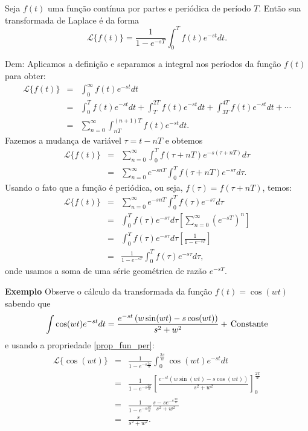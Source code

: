 \documentclass[a4paper,10pt]{book}
\begin{document}
 Seja $f(t)$ uma função contínua por partes e periódica de período $T$. Então sua transformada de Laplace é da forma
\begin{equation}
\mathcal{L}\{f(t)\}=\frac{1}{1-e^{-sT}}\int_0^Tf(t)e^{-st}dt.
\end{equation}


Dem: Aplicamos a definição e separamos a integral nos períodos da função $f(t)$ para obter:
\begin{eqnarray*}
 \mathcal{L}\{f(t)\}&=&\int_0^\infty f(t)e^{-st}dt \\
 &=&\int_0^T f(t)e^{-st}dt+\int_T^{2T} f(t)e^{-st}dt+\int_{3T}^{4T} f(t)e^{-st}dt+\cdots\\
 &=&\sum_{n=0}^\infty \int_{nT}^{(n+1)T} f(t)e^{-st}dt.
\end{eqnarray*}
Fazemos a mudança de variável $\tau=t-nT$ e obtemos
 \begin{eqnarray*}
 \mathcal{L}\{f(t)\}&=&\sum_{n=0}^\infty \int_{0}^{T} f(\tau+nT)e^{-s(\tau+nT)}d\tau\\
 &=&\sum_{n=0}^\infty e^{-snT} \int_{0}^{T} f(\tau+nT)e^{-s\tau}d\tau.
 \end{eqnarray*}
 Usando o fato que a função é periódica, ou seja, $f(\tau)=f(\tau+nT)$, temos:
 \begin{eqnarray*}
  \mathcal{L}\{f(t)\}&=&\sum_{n=0}^\infty e^{-snT} \int_{0}^{T} f(\tau)e^{-s\tau}d\tau\\
 &=&\int_{0}^{T} f(\tau)e^{-s\tau}d\tau\left[\sum_{n=0}^\infty \left(e^{-sT}\right)^n \right]\\
 &=&\int_{0}^{T} f(\tau)e^{-s\tau}d\tau\left[\frac{1}{1-e^{-sT}} \right]\\
 &=&\frac{1}{1-e^{-sT}}\int_{0}^{T} f(\tau)e^{-s\tau}d\tau,
\end{eqnarray*}
onde usamos a soma de uma série geométrica de razão $e^{-sT}$.
 
 
{\bf Exemplo} Observe o cálculo da transformada da função $f(t)=\cos(wt)$ sabendo que
\begin{equation}
\int \cos(wt)e^{-st}dt=\frac{e^{-st}\left(w\sin(wt)-s\cos(wt)\right)}{s^2+w^2}+\ \!\hbox{Constante}
\end{equation}
e usando a propriedade \ref{prop_fun_per}:
\begin{eqnarray*} 
\mathcal{L}\{\cos(wt)\}&=&\frac{1}{1-e^{-s\frac{2\pi }{w}}}\int_0^{\frac{2\pi }{w}}\cos(wt)e^{-st}dt\\
&=&\frac{1}{1-e^{-s\frac{2\pi }{w}}}\left[\frac{e^{-st}\left(w\sin(wt)-s\cos(wt)\right)}{s^2+w^2}\right]_0^{\frac{2\pi }{w}}\\
&=&\frac{1}{1-e^{-s\frac{2\pi }{w}}}\frac{s-se^{-s\frac{2\pi }{w}}}{s^2+w^2}\\
&=&\frac{s}{s^2+w^2}.
\end{eqnarray*}
\end{document}
